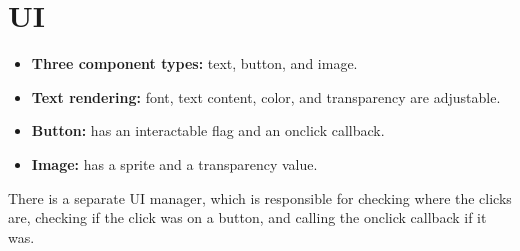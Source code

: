 \section{UI}
\label{sec:ui}
\begin{itemize}
    \item \textbf{Three component types:} text, button, and image.
    \item \textbf{Text rendering:} font, text content, color, and transparency are adjustable.
    \item \textbf{Button:} has an interactable flag and an onclick callback.
    \item \textbf{Image:} has a sprite and a transparency value.
\end{itemize}

\noindent
There is a separate UI manager, which is responsible for checking where the clicks are, checking if the click was on a button, and calling the onclick callback if it was.